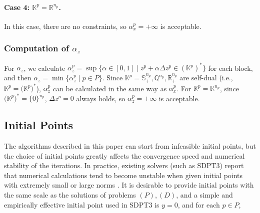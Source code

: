 \paragraph{Case 4: $\mathbb{K}^p = \mathbb{R}^{n_p}$.}
In this case, there are no constraints, so $\alpha^p_x=+\infty$ is acceptable.

\medskip

\subsubsection{Computation of $\alpha_z$}
For $\alpha_z$, we calculate $\alpha^p_z = \sup\{\alpha\in [0, 1] \mid z^p + \alpha\Delta z^p \in (\mathbb{K}^p)^*\}$ for each block, and then $\alpha_z=\min\{\alpha^p_z \mid p \in P\}$.
Since $\mathbb{K}^p=\mathbb{S}^{n_p}_+,\mathbb{Q}^{n_p},\mathbb{R}^{n_p}_+$ are self-dual (i.e., $\mathbb{K}^p = \bigl(\mathbb{K}^p\bigr)^*$), $\alpha^p_z$ can be calculated in the same way as $\alpha^p_x$.
For $\mathbb{K}^p=\mathbb{R}^{n_p}$, since $\bigl(\mathbb{K}^p\bigr)^*=\{0\}^{n_p}$, $\Delta z^p = 0$ always holds, so $\alpha^p_z=+\infty$ is acceptable.

\medskip

\subsection{Initial Points}
\label{sec:initial_points}
The algorithms described in this paper can start from infeasible initial points, but the choice of initial points greatly affects the convergence speed and numerical stability of the iterations.
In practice, existing solvers (such as SDPT3) report that numerical calculations tend to become unstable when given initial points with extremely small or large norms \cite{toh1999}.
It is desirable to provide initial points with the same scale as the solutions of problems $(P),(D)$, and a simple and empirically effective initial point used in SDPT3 is $y = 0$, and for each $p\in P$,

